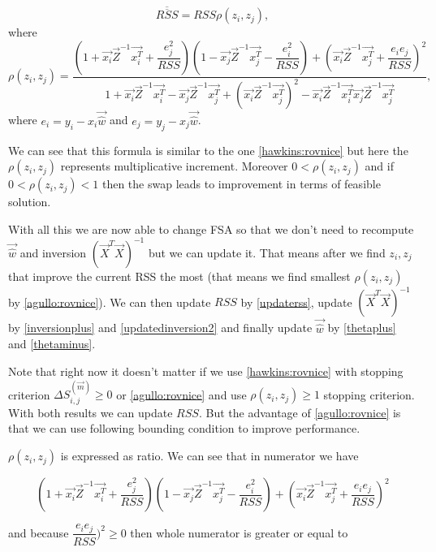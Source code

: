 \begin{equation} \label{updaterss}
	\overline{\overline{RSS}}  = RSS\rho(z_i, z_j),
\end{equation}
where
\begin{equation} \label{agullo:rovnice}
	\rho(z_i, z_j) =
	 \dfrac
	 {(1+\vec{x_i}\vec{Z}^{-1}\vec{x_i^T} + \dfrac{e_j^2}{RSS})
		(1 - \vec{x_j}\vec{Z}^{-1}\vec{x_j^T} - \dfrac{e_i^2}{RSS} )+
		(\vec{x_i}\vec{Z}^{-1}\vec{x_j^T} + \dfrac{e_i e_j}{RSS} )^2}
	{1 + \vec{x_i}\vec{Z}^{-1}\vec{x_i^T}  - \vec{x_j}\vec{Z}^{-1}\vec{x_j^T}  + ( \vec{x_i}\vec{Z}^{-1}\vec{x_j^T})^2 -   \vec{x_i}\vec{Z}^{-1}\vec{x_i^T}\vec{x_j}\vec{Z}^{-1}\vec{x_j^T} },
\end{equation}
where $e_i = y_i - x_i\vec{\hat{w}}$ and $e_j = y_j - x_j\vec{\hat{w}}$.

We can see that this formula is similar to the one \ref{hawkins:rovnice} but here the $\rho(z_i, z_j)$ represents multiplicative increment. Moreover $0 < \rho(z_i, z_j) $ and if $0 < \rho(z_i, z_j)< 1 $ then the swap leads to improvement in terms of feasible solution.

With all this we are now able to change FSA so that we don't need to recompute $\vec{\hat{w}}$ and inversion $(\vec{X}^T \vec{X})^{-1}$ but we can update it. That means after we find $z_i, z_j$ that improve the current RSS the most (that means we find smallest $\rho(z_i, z_j)$ by \ref{agullo:rovnice}). We can then update $RSS$ by \ref{updaterss}, update $(\vec{X}^T \vec{X})^{-1}$ by \ref{inversionplus} and \ref{updatedinversion2} and finally update $\vec{\hat{w}}$ by \ref{thetaplus} and \ref{thetaminus}.

Note that right now it doesn't matter if we use \ref{hawkins:rovnice} with stopping criterion $	\Delta S^{(\vec{m})}_{i,j} \geq 0$  or \ref{agullo:rovnice} and use $\rho(z_i, z_j) \geq 1 $ stopping criterion. With both results we can update $RSS$. But the advantage of \ref{agullo:rovnice} is that we can use following bounding condition to improve performance.

$\rho(z_i, z_j)$ is expressed as ratio. We can see that in numerator we have

\begin{equation}
	(1+\vec{x_i}\vec{Z}^{-1}\vec{x_i^T} + \dfrac{e_j^2}{RSS})
		(1 - \vec{x_j}\vec{Z}^{-1}\vec{x_j^T} - \dfrac{e_i^2}{RSS} )+
		(\vec{x_i}\vec{Z}^{-1}\vec{x_j^T} + \dfrac{e_i e_j}{RSS} )^2
\end{equation}

and because $ \dfrac{e_i e_j}{RSS} )^2 \geq 0$ then whole numerator is greater or equal to

